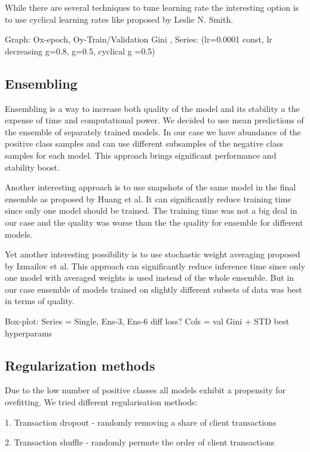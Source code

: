 \documentclass{sigkddExp}
\begin{document}
While there are several techniques to tune learning rate the interesting option is to use cyclical learning rates like proposed by Leslie N. Smith.\cite{DBLP:journals/corr/Smith15a}

Graph: Ox-epoch, Oy-Train/Validation Gini , Series: (lr=0.0001 const, lr decreasing g=0.8, g=0.5, cyclical g =0.5) 


\subsection{Ensembling}

Ensembling is a way to increase both quality of the model and its stability a the expense of time and computational power. We decided to use mean predictions of the ensemble of separately trained models. In our case we have abundance of the positive class samples and can use different subsamples of the negative class samples for each model. This approach brings significant performance and stability boost.

Another interesting approach is to use snapshots of the same model in the final ensemble as proposed by Huang et al.\cite{DBLP:journals/corr/HuangLPLHW17} It can significantly reduce training time since only one model should be trained. The training time was not a big deal in our case and the quality was worse than the the quality for ensemble for different models.

Yet another interesting possibility is to use stochastic weight averaging proposed by Izmailov et al.\cite{DBLP:journals/corr/LoshchilovH16a} This approach can significantly reduce inference time since only one model with averaged weights is used instead of the whole ensemble. But in our case ensemble of models trained on slightly different subsets of data was best in terms of quality.

Box-plot: Series = {Single, Ens-3, Ens-6  diff loss? } Cols = {val Gini + STD}
best hyperparams


\subsection{Regularization methods}

Due to the low number of positive classes all models exhibit a propensity for ovefitting. We tried different regularisation methods:

1. Transaction dropout - randomly removing a share of client transactions

2. Transaction shuffle - randomly permute the order of client transactions
\end{document}
